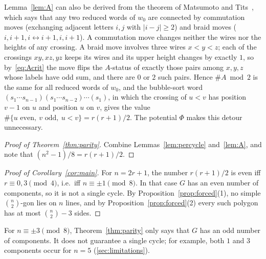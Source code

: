 \begin{remark}\label{rem:MT}
Lemma~\ref{lem:A} can also be derived from the theorem of Matsumoto and
Tits~\cite{Matsumoto1964,Tits1969}, which says that any two reduced words of $w_0$ are connected by
commutation moves (exchanging adjacent letters $i,j$ with $|i-j|\ge2$) and braid moves
($i,i+1,i\leftrightarrow i+1,i,i+1$). A commutation move changes neither the wires nor the heights
of any crossing. A braid move involves three wires $x<y<z$; each of the crossings $xy,xz,yz$ keeps its
wires and its upper height changes by exactly $1$, so by~\eqref{eq:Acrit} the move flips the
$A$-status of exactly those pairs among $x,y,z$ whose labels have odd sum, and there are $0$ or $2$ such
pairs. Hence $\#A\bmod 2$ is the same for all reduced words of $w_0$, and the bubble-sort word
$(s_1\cdots s_{n-1})(s_1\cdots s_{n-2})\cdots(s_1)$, in which the crossing of $u<v$ has position $v-1$
on $u$ and position $u$ on $v$, gives the value $\#\{u\text{ even},\ v\text{ odd},\ u<v\}=r(r+1)/2$. The
potential $\Phi$ makes this detour unnecessary.
\end{remark}

\begin{proof}[Proof of Theorem~\ref{thm:parity}]
Combine Lemmas~\ref{lem:percycle} and~\ref{lem:A}, and note that $(n^2-1)/8=r(r+1)/2$.
\end{proof}

\begin{proof}[Proof of Corollary~\ref{cor:main}]
For $n=2r+1$, the number $r(r+1)/2$ is even iff $r\equiv0,3\pmod 4$, i.e.\ iff $n\equiv\pm1\pmod 8$.
In that case $G$ has an even number of components, so it is not a single cycle. By
Proposition~\ref{prop:forced}(1), no simple $\binom n2$-gon lies on $n$ lines, and by Proposition~\ref{prop:forced}(2) every
such polygon has at most $\binom n2-3$ sides.
\end{proof}

\begin{remark}
For $n\equiv\pm3\pmod 8$, Theorem~\ref{thm:parity} only says that $G$ has an odd number of components. It does
not guarantee a single cycle; for example, both $1$ and $3$ components occur for $n=5$
(\cref{sec:limitations}).
\end{remark}
